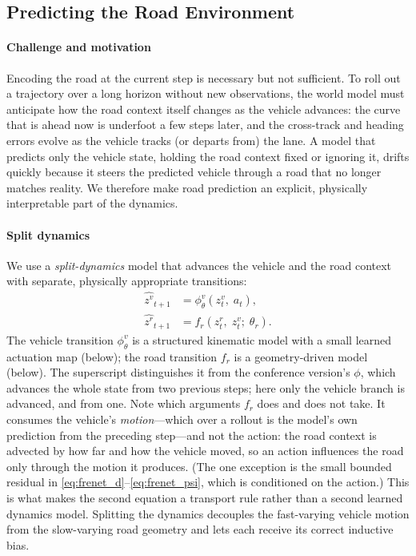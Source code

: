 \documentclass[preprint,12pt]{elsarticle}
\newcommand{\zv}{z^{v}}      %
\newcommand{\zr}{z^{r}}      %
\begin{document}
\subsection{Predicting the Road Environment}\label{sec:prediction}  %

\paragraph{Challenge and motivation}
Encoding the road at the current step is necessary but not sufficient.
To roll out a trajectory over a long horizon without new observations, the world
model must anticipate how the road context itself changes as the vehicle advances:
the curve that is ahead now is underfoot a few steps later, and the cross-track
and heading errors evolve as the vehicle tracks (or departs from) the lane.
A model that predicts only the vehicle state, holding the road context fixed or
ignoring it, drifts quickly because it steers the predicted vehicle through a road
that no longer matches reality.
We therefore make road prediction an explicit, physically interpretable part of
the dynamics.

\paragraph{Split dynamics}
We use a \emph{split-dynamics} model that advances the vehicle and the road
context with separate, physically appropriate transitions:
\begin{align}
    \hat{\zv}_{t+1} &= \phi^{v}_\theta(\zv_t,\; a_t),
        \label{eq:split_vehicle}\\
    \hat{\zr}_{t+1} &= f_r(\zr_t,\; \zv_t;\; \theta_r).
        \label{eq:split_road}
\end{align}
The vehicle transition $\phi^{v}_\theta$ is a structured kinematic model with a
small learned actuation map (below); the road transition $f_r$ is a geometry-driven
model (below). The superscript distinguishes it from the conference version's
$\phi$, which advances the whole state from two previous steps; here only the
vehicle branch is advanced, and from one.
Note which arguments $f_r$ does and does not take.
It consumes the vehicle's \emph{motion}---which over a rollout is the model's
own prediction from the preceding step---and not the action: the road context
is advected by how far and how the vehicle moved, so an action influences the
road only through the motion it produces.
(The one exception is the small bounded residual in
\eqref{eq:frenet_d}--\eqref{eq:frenet_psi}, which is conditioned on the
action.)
This is what makes the second equation a transport rule rather than a second
learned dynamics model.
Splitting the dynamics decouples the fast-varying vehicle motion from the
slow-varying road geometry and lets each receive its correct inductive bias.
\end{document}
